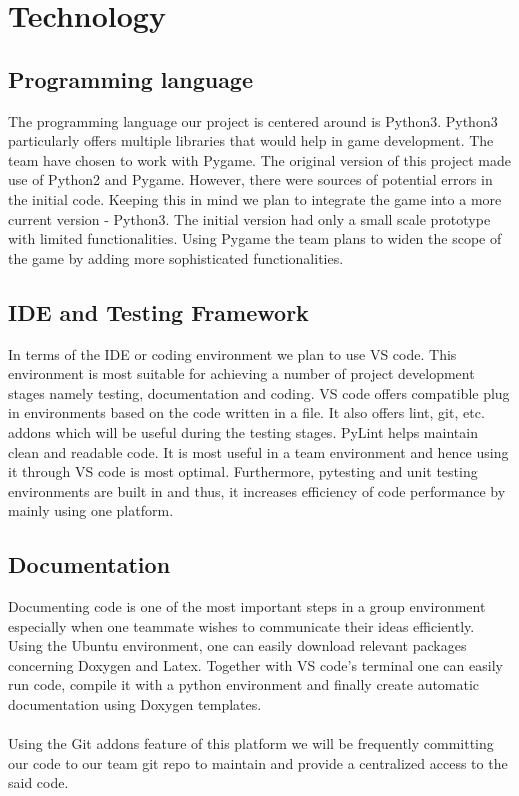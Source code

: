 \documentclass{article}
\begin{document}
\section{Technology}
\subsection{Programming language}
The programming language our project is centered around is Python3. Python3 particularly offers multiple libraries that would help in game development. The team have chosen to work with Pygame. The original version of this project made use of Python2 and Pygame. However, there were sources of potential errors in the initial code. Keeping this in mind we plan to integrate the game into a more current version - Python3. The initial version had only a small scale prototype with limited functionalities. Using Pygame the team plans to widen the scope of the game by adding more sophisticated functionalities.
\subsection{IDE and Testing Framework}
In terms of the IDE or coding environment we plan to use VS code. This environment is most suitable for achieving a number of project development stages namely testing, documentation and coding. VS code offers compatible plug in environments based on the code written in a file. It also offers lint, git, etc. addons which will be useful during the testing stages. PyLint helps maintain clean and readable code. It is most useful in a team environment and hence using it through VS code is most optimal. Furthermore, pytesting and unit testing environments are built in and thus, it increases efficiency of code performance by mainly using one platform. 
\subsection{Documentation}
Documenting code is one of the most important steps in a group environment especially when one teammate wishes to communicate their ideas efficiently. Using the Ubuntu environment, one can easily download relevant packages concerning Doxygen and Latex. Together with VS code's terminal one can easily run code, compile it with a python environment and finally create automatic documentation using Doxygen templates.\\\\
Using the Git addons feature of this platform we will be frequently committing our code to our team git repo to maintain and provide a centralized access to the said code.
\end{document}
